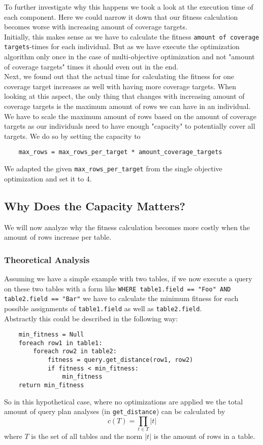 To further investigate why this happens we took a look at the execution time of each component. Here we could narrow it down that our fitness calculation becomes worse with increasing amount of coverage targets.\\
Initially, this makes sense as we have to calculate the fitness \verb|amount of coverage targets|-times for each individual. But as we have execute the optimization algorithm only once in the case of multi-objective optimization and not "amount of coverage targets" times it should even out in the end.\\
Next, we found out that the actual time for calculating the fitness for one coverage target increases as well with having more coverage targets. When looking at this aspect, the only thing that changes with increasing amount of coverage targets is the maximum amount of rows we can have in an individual.\\
We have to scale the maximum amount of rows based on the amount of coverage targets as our individuals need to have enough "capacity" to potentially cover all targets. We do so by setting the capacity to
\begin{verbatim}
	max_rows = max_rows_per_target * amount_coverage_targets
\end{verbatim}
We adapted the given \verb|max_rows_per_target| from the single objective optimization and set it to 4.

\subsection{Why Does the Capacity Matters?}
\label{sec:why_capacity_matters}
We will now analyze why the fitness calculation becomes more costly when the amount of rows increase per table.

\subsubsection{Theoretical Analysis}

Assuming we have a simple example with two tables, if we now execute a query on these two tables with a form like \verb|WHERE table1.field == "Foo" AND table2.field == "Bar"| we have to calculate the minimum fitness for each possible assignments of \verb|table1.field| as well as \verb|table2.field|.\\
Abstractly this could be described in the following way:
\begin{verbatim}
    min_fitness = Null
    foreach row1 in table1:
        foreach row2 in table2:
            fitness = query.get_distance(row1, row2)
            if fitness < min_fitness:
                min_fitness
    return min_fitness
\end{verbatim}
So in this hypothetical case, where no optimizations are applied we the total amount of query plan analyses (in \verb|get_distance|) can be calculated by
\begin{equation}
	\label{eqn:comparisons_for_fitness}
	c(T) = \prod_{t \in T} |t|
\end{equation}
where $T$ is the set of all tables and the norm $|t|$ is the amount of rows in a table.

